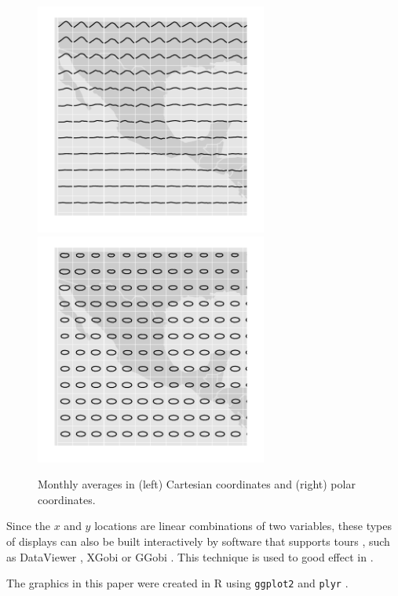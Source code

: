 \documentclass[oneside]{article}
\begin{document}
\begin{figure}[htbp]
  \centering
  \includegraphics[width=3in]{month-cartesian}
  \includegraphics[width=3in]{month-polar}
    
  \caption{Monthly averages in (left) Cartesian coordinates and (right) polar coordinates.}
  
  \label{fig:cycle}
\end{figure}

Since the $x$ and $y$ locations are linear combinations of two variables, these types of displays can also be built interactively by software that supports tours \citep{cook:2006}, such as DataViewer \citep{buja:1986}, XGobi \citep{swayne:1991} or GGobi \citep{swayne:2003}.  This technique is used to good effect in \citet{buja:1996a}.


The graphics in this paper were created in R \citep{R} using {\tt ggplot2} \citep{me:ggplot2} and {\tt plyr} \citep{me:plyr}. 
\end{document}

